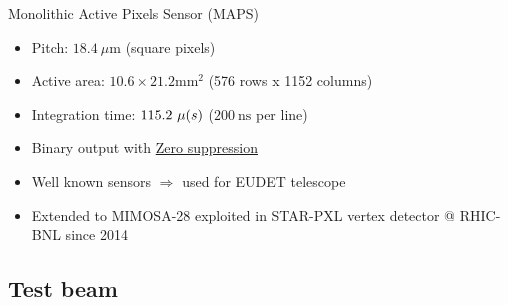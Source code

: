 \documentclass{beamer}
\newcommand{\grille}{
    \begin{tikzpicture}[overlay,remember picture]
        \begin{scope}[shift={(current page.south west)}]
            \draw[gray!50] (0,0) grid[step=2mm] (current page.north east);
            \draw[red!50] (0,0) grid[step=1cm] (current page.north east);
            \draw (0.2,1) node {1};
            \draw (0.2,2) node {2};
            \draw (0.2,3) node {3};
            \draw (0.2,4) node {4};
            \draw (0.2,5) node {5};
            \draw (0.2,6) node {6};
            \draw (0.2,7) node {7};
            \draw (0.2,8) node {8};
            \draw (0.2,9) node {9};
            \draw (1,0.5) node {1};
            \draw (2,0.5) node {2};
            \draw (3,0.5) node {3};
            \draw (4,0.5) node {4};
            \draw (5,0.5) node {5};
            \draw (6,0.5) node {6};
            \draw (7,0.5) node {7};
            \draw (8,0.5) node {8};
            \draw (9,0.5) node {9};
            \draw (10,0.5) node {10};
            \draw (11,0.5) node {11};
            \draw (12,0.5) node {12};
        \end{scope}
    \end{tikzpicture}
}
\begin{document}
\begin{frame}
  \begin{block}{Monolithic Active Pixels Sensor (MAPS)}
    \scriptsize{
    \begin{itemize}
      \item Pitch: $18.4~\mu\text{m}$ (square pixels)
      \item Active area: $10.6 \times 21.2 \text{mm}^2$ (576 rows x 1152 columns)
      \item Integration time: $115.2~\mu\text(s)$ ($200~\text{ns}$ per line)
      \item Binary output with \hyperlink{suze}{Zero suppression}
      \item Well known sensors $\Rightarrow$ used for EUDET telescope
      \item Extended to MIMOSA-28 exploited in STAR-PXL vertex detector @ RHIC-BNL since 2014
    \end{itemize}
   }
  \end{block}

\end{frame}

  \subsection{Test beam}
\end{document}

